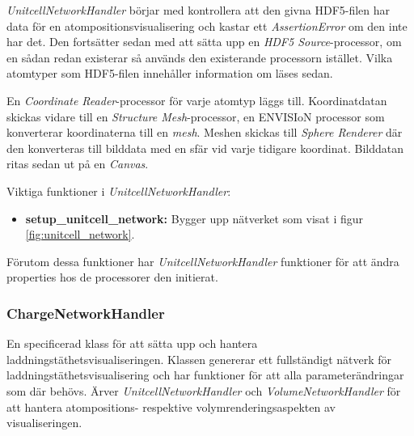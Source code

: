 
\textit{UnitcellNetworkHandler} börjar med kontrollera att den givna HDF5-filen har data för en atompositionsvisualisering och kastar ett \textit{AssertionError} om den inte har det. Den fortsätter sedan med att sätta upp en \textit{HDF5 Source}-processor, om en sådan redan existerar så används den existerande processorn istället. Vilka atomtyper som HDF5-filen innehåller information om läses sedan. 

En \textit{Coordinate Reader}-processor för varje atomtyp  läggs till. Koordinatdatan skickas vidare till en \textit{Structure Mesh}-processor, en ENVISIoN processor som konverterar koordinaterna till en \textit{mesh}. Meshen skickas till \textit{Sphere Renderer} där den konverteras till bilddata med en sfär vid varje tidigare koordinat. Bilddatan ritas sedan ut på en \textit{Canvas}.

Viktiga funktioner i \textit{UnitcellNetworkHandler}:
\begin{itemize}
    \setlength\itemsep{0em}
    \item \textbf{setup\_unitcell\_network: } Bygger upp nätverket som visat i figur \ref{fig:unitcell_network}.
\end{itemize}

Förutom dessa funktioner har \textit{UnitcellNetworkHandler} funktioner för att ändra properties hos de processorer den initierat.


\subsubsection{ChargeNetworkHandler}
En specificerad klass för att sätta upp och hantera laddningstäthetsvisualiseringen. Klassen genererar ett fullständigt nätverk för laddningstäthetsvisualisering och har funktioner för att alla parameterändringar som där behövs. Ärver \textit{UnitcellNetworkHandler} och \textit{VolumeNetworkHandler} för att hantera atompositions- respektive volymrenderingsaspekten av visualiseringen.  



